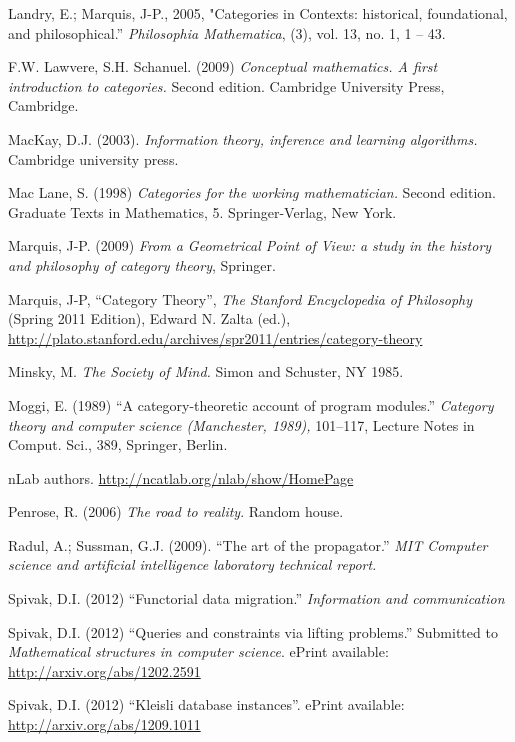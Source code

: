 \begin{thebibliography}{SGWB}
 Landry, E.; Marquis, J-P., 2005, "Categories in Contexts: historical, foundational, and philosophical.'' \textit{Philosophia Mathematica}, (3), vol. 13, no. 1, 1 -- 43.

 F.W. Lawvere, S.H. Schanuel. (2009) \textit{Conceptual mathematics. 
A first introduction to categories.} Second edition. Cambridge University Press, Cambridge.

 MacKay, D.J. (2003). \textit{Information theory, inference and learning algorithms.} Cambridge university press.

 Mac Lane, S. (1998) \textit{Categories for the working mathematician.} Second edition. Graduate Texts in Mathematics, 5. Springer-Verlag, New York.

 Marquis, J-P. (2009) \textit{From a Geometrical Point of View: a study in the history and philosophy of category theory}, Springer.

 Marquis, J-P, ``Category Theory'', \textit{The Stanford Encyclopedia of Philosophy} (Spring 2011 Edition), Edward N. Zalta (ed.), \url{http://plato.stanford.edu/archives/spr2011/entries/category-theory}

 Minsky, M. \textit{The Society of Mind.}  Simon and Schuster, NY 1985.

 Moggi, E. (1989) ``A category-theoretic account of program modules.'' \textit{Category theory and computer science (Manchester, 1989),} 101--117, Lecture Notes in Comput. Sci., 389, Springer, Berlin. 

 nLab authors.  \url{http://ncatlab.org/nlab/show/HomePage}

 Penrose, R. (2006) \textit{The road to reality}. Random house.

 Radul, A.; Sussman, G.J. (2009). ``The art of the propagator.'' \textit{MIT Computer science and artificial intelligence laboratory technical report.}

 Spivak, D.I. (2012) ``Functorial data migration.'' \textit{Information and communication} 

 Spivak, D.I. (2012) ``Queries and constraints via lifting problems.'' Submitted to \textit{Mathematical structures in computer science}. ePrint available: \url{http://arxiv.org/abs/1202.2591}

 Spivak, D.I. (2012) ``Kleisli database instances''. ePrint available: \url{http://arxiv.org/abs/1209.1011}


\end{thebibliography}
